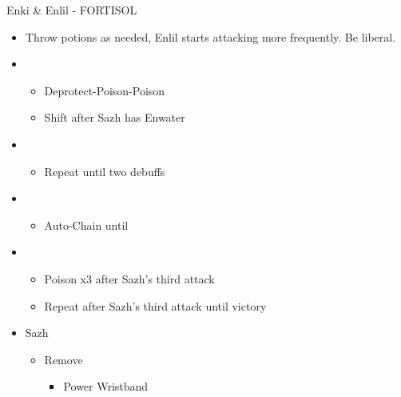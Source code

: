 \begin{battle}[1:30]{Enki \& Enlil - FORTISOL}
\begin{itemize}
\begin{itemize}
				      \item Potion
				      \item Repeat after Sazh's third Attack
				      \item If Enki Bellows, do Poison-Deprotect-Poison until Deprotect hits.
			      \end{itemize}
			\item Throw potions as needed, Enlil starts attacking more frequently. Be liberal.
			\item \third
			      \begin{itemize}
				      \item Deprotect-Poison-Poison
				      \item Shift after Sazh has Enwater
			      \end{itemize}
			\item \fifth
			      \begin{itemize}
				      \item Repeat until two debuffs
			      \end{itemize}
			\item \fourth
			      \begin{itemize}
				      \item Auto-Chain until \stagger
			      \end{itemize}
			\item \sixth
			      \begin{itemize}
				      \item Poison x3 after Sazh's third attack
				      \item Repeat after Sazh's third attack until victory
			      \end{itemize}
		\end{itemize}
		\end{battle}
\begin{menu}
	\begin{itemize}
		\equip
		\begin{itemize}
			\item Sazh
			      \begin{itemize}
				      \item Remove
				            \begin{itemize}
					            \item Power Wristband
				            \end{itemize}
			      \end{itemize}
		\end{itemize}
	\end{itemize}
\end{menu}
